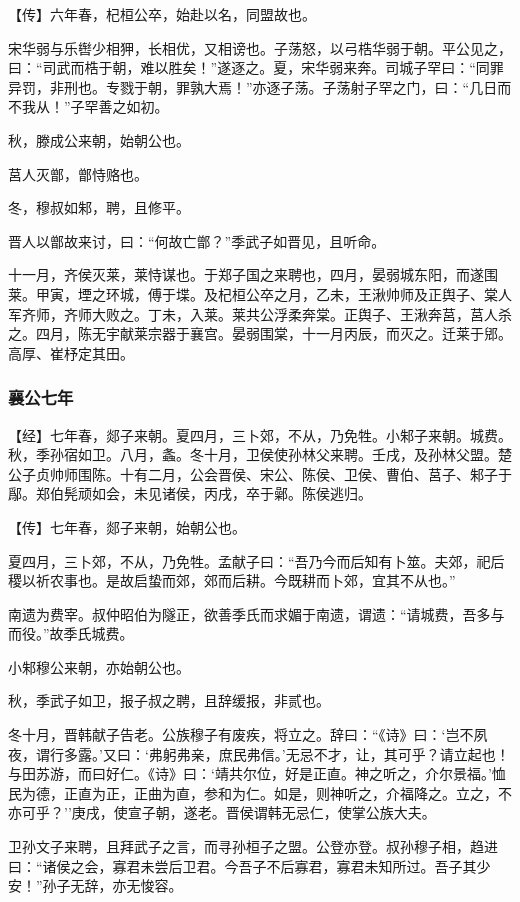 \documentclass[]{article}
\begin{document}
【传】六年春，杞桓公卒，始赴以名，同盟故也。

宋华弱与乐辔少相狎，长相优，又相谤也。子荡怒，以弓梏华弱于朝。平公见之，曰：``司武而梏于朝，难以胜矣！''遂逐之。夏，宋华弱来奔。司城子罕曰：``同罪异罚，非刑也。专戮于朝，罪孰大焉！''亦逐子荡。子荡射子罕之门，曰：``几日而不我从！''子罕善之如初。

秋，滕成公来朝，始朝公也。

莒人灭鄫，鄫恃赂也。

冬，穆叔如邾，聘，且修平。

晋人以鄫故来讨，曰：``何故亡鄫？''季武子如晋见，且听命。

十一月，齐侯灭莱，莱恃谋也。于郑子国之来聘也，四月，晏弱城东阳，而遂围莱。甲寅，堙之环城，傅于堞。及杞桓公卒之月，乙未，王湫帅师及正舆子、棠人军齐师，齐师大败之。丁未，入莱。莱共公浮柔奔棠。正舆子、王湫奔莒，莒人杀之。四月，陈无宇献莱宗器于襄宫。晏弱围棠，十一月丙辰，而灭之。迁莱于郳。高厚、崔杼定其田。

\hypertarget{header-n1886}{%
\subsubsection{襄公七年}\label{header-n1886}}

【经】七年春，郯子来朝。夏四月，三卜郊，不从，乃免牲。小邾子来朝。城费。秋，季孙宿如卫。八月，螽。冬十月，卫侯使孙林父来聘。壬戌，及孙林父盟。楚公子贞帅师围陈。十有二月，公会晋侯、宋公、陈侯、卫侯、曹伯、莒子、邾子于鄬。郑伯髡顽如会，未见诸侯，丙戌，卒于鄵。陈侯逃归。

【传】七年春，郯子来朝，始朝公也。

夏四月，三卜郊，不从，乃免牲。孟献子曰：``吾乃今而后知有卜筮。夫郊，祀后稷以祈农事也。是故启蛰而郊，郊而后耕。今既耕而卜郊，宜其不从也。''

南遗为费宰。叔仲昭伯为隧正，欲善季氏而求媚于南遗，谓遗：``请城费，吾多与而役。''故季氏城费。

小邾穆公来朝，亦始朝公也。

秋，季武子如卫，报子叔之聘，且辞缓报，非贰也。

冬十月，晋韩献子告老。公族穆子有废疾，将立之。辞曰：``《诗》曰：`岂不夙夜，谓行多露。'又曰：`弗躬弗亲，庶民弗信。'无忌不才，让，其可乎？请立起也！与田苏游，而曰好仁。《诗》曰：`靖共尔位，好是正直。神之听之，介尔景福。'恤民为德，正直为正，正曲为直，参和为仁。如是，则神听之，介福降之。立之，不亦可乎？''庚戌，使宣子朝，遂老。晋侯谓韩无忌仁，使掌公族大夫。

卫孙文子来聘，且拜武子之言，而寻孙桓子之盟。公登亦登。叔孙穆子相，趋进曰：``诸侯之会，寡君未尝后卫君。今吾子不后寡君，寡君未知所过。吾子其少安！''孙子无辞，亦无悛容。
\end{document}
